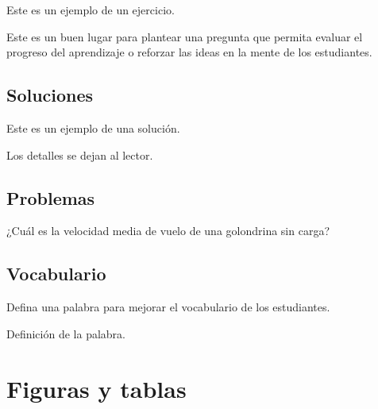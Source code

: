Este es un ejemplo de un ejercicio.

\begin{exercise}
	Este es un buen lugar para plantear una pregunta que permita evaluar el progreso del aprendizaje o reforzar las ideas en la mente de los estudiantes.
\end{exercise}


\subsection{Soluciones}

Este es un ejemplo de una solución.

\begin{solution}
	Los detalles se dejan al lector.
\end{solution}




\subsection{Problemas}

\begin{problem}
	¿Cuál es la velocidad media de vuelo de una golondrina sin carga?
\end{problem}


\subsection{Vocabulario}

Defina una palabra para mejorar el vocabulario de los estudiantes.

\begin{vocabulary}[Palabra]
	Definición de la palabra.
\end{vocabulary}



\section{Figuras y tablas}


